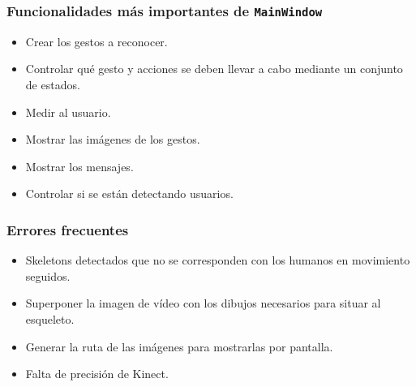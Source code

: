 \documentclass[leqno]{beamer}
\begin{document}
\begin{frame}
\frametitle{Funcionalidades más importantes de \texttt{MainWindow}}

\begin{itemize}
\item Crear los gestos a reconocer.
\item Controlar qué gesto y acciones se deben llevar a cabo mediante un conjunto de estados.
\item Medir al usuario.
\item Mostrar las imágenes de los gestos.
\item Mostrar los mensajes.
\item Controlar si se están detectando usuarios.
\end{itemize}
\end{frame}

\begin{frame}
\frametitle{Errores frecuentes}

\begin{itemize}
\item Skeletons detectados que no se corresponden con los humanos en movimiento seguidos.
\item Superponer la imagen de vídeo con los dibujos necesarios para situar al esqueleto.
\item Generar la ruta de las imágenes para mostrarlas por pantalla.
\item Falta de precisión de Kinect.
\end{itemize}
\end{frame}


\end{document}
